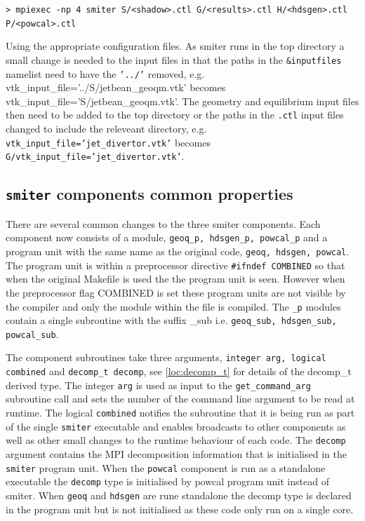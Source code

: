 {\tt > mpiexec -np 4 smiter S/<shadow>.ctl G/<results>.ctl H/<hdsgen>.ctl P/<powcal>.ctl}

Using the appropriate configuration files. As smiter runs in the top directory a small change is needed to the input files in that the paths in the {\tt \&inputfiles} namelist need to have the {\tt '../'} removed, e.g. {vtk\_input\_file='../S/jetbean\_geoqm.vtk'} becomes {vtk\_input\_file='S/jetbean\_geoqm.vtk'}. The geometry and equilibrium input files then need to be added to the top directory or the paths in the {\tt .ctl} input files changed to include the releveant directory, e.g. {\tt vtk\_input\_file='jet\_divertor.vtk'} becomes  {\tt G/vtk\_input\_file='jet\_divertor.vtk'}.


\subsection{{\tt smiter} components common properties}
There are several common changes to the three smiter components. Each component now consists of a module, {\tt geoq\_p, hdsgen\_p, powcal\_p} and a program unit with the same name as the original code, {\tt geoq, hdsgen, powcal}. The program unit is within a preprocessor directive {\tt \#ifndef COMBINED} so that when the original Makefile is used the the program unit is seen. However when the preprocessor flag COMBINED is set these program units are not visible by the compiler and only the module within the file is compiled. The {\tt \_p} modules contain a single subroutine with the suffix {\_sub} i.e. {\tt geoq\_sub, hdsgen\_sub, powcal\_sub}. 

The component subroutines take three arguments, {\tt integer arg, logical combined} and {\tt decomp\_t decomp}, see \ref{loc:decomp_t} for details of the {decomp\_t} derived type. The integer {\tt arg} is used as input to the {\tt get\_command\_arg} subroutine call and sets the number of the command line argument to be read at runtime. The logical {\tt combined} notifies the subroutine that it is being run as part of the single {\tt smiter} executable and enables broadcasts to other components as well as other small changes to the runtime behaviour of each code. The {\tt decomp} argument contains the MPI decomposition information that is initialised in the {\tt smiter} program unit. When the {\tt powcal} component is run as a standalone executable the {\tt decomp} type is initialised by powcal program unit instead of smiter. When {\tt geoq} and {\tt hdsgen} are rune standalone the decomp type is declared in the program unit but is not initialised as these code only run on a single core.

